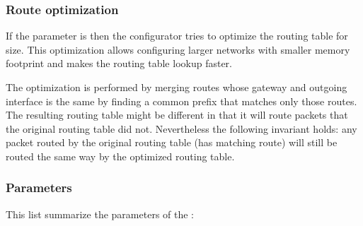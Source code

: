 \subsubsection*{Route optimization}

If the  parameter is  then the
configurator tries to optimize the routing table for size.
This optimization allows configuring larger networks with smaller
memory footprint and makes the routing table lookup faster.

The optimization is performed by merging routes whose gateway and
outgoing interface is the same by finding a common prefix that
matches only those routes. The resulting routing table might be
different in that it will route packets that the original routing table
did not. Nevertheless the following invariant holds: any packet routed
by the original routing table (has matching route) will still be routed
the same way by the optimized routing table.

\subsubsection*{Parameters}

This list summarize the parameters of the :

